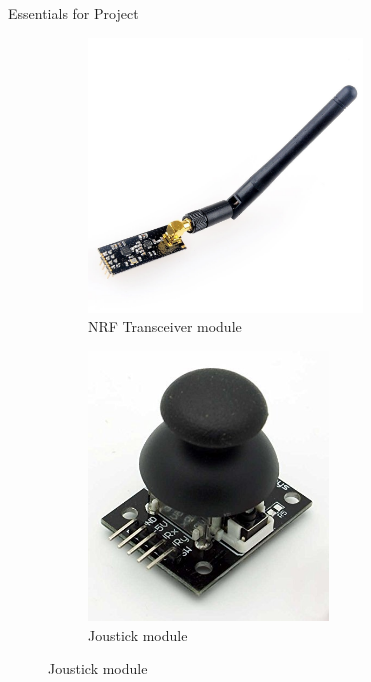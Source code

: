 \documentclass[12pt, oneside]{report}
\numberwithin{equation}{section}
\begin{document}
\begin{chapter}{Essentials for Project}
\begin{figure}[h]
\center
\begin{subfigure}[hb]{0.3\textwidth}
\includegraphics[width=0.8\textwidth]{transreceiver}
\caption{NRF Transceiver module}
\end{subfigure}
\begin{subfigure}[hb]{0.3\textwidth}
\includegraphics[width=0.7\textwidth]{joystick}
\caption{Joustick module}
\end{subfigure}
\end{figure}



\end{chapter}
\end{document}
